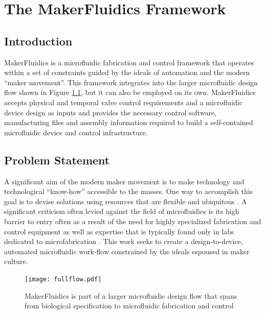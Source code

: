 \chapter{The MakerFluidics Framework}
\label{chapter:mf}
\thispagestyle{myheadings}

\graphicspath{{2_MakerFluidics/Figures/}}

\section{Introduction}
\label{sec:mfIntro}

MakerFluidics is a microfluidic fabrication and control framework that operates within a set of constraints guided by the ideals of automation and the modern ``maker movement''. This framework integrates into the larger microfluidic design flow shown in Figure \ref{fig:fullflow}, but it can also be employed on its own. MakerFluidics accepts physical and temporal valve control requirements and a microfluidic device design as inputs and provides the necessary control software, manufacturing files and assembly information required to build a self-contained microfluidic device and control infrastructure.

\section{Problem Statement}
\label{sec:mfPS}
A significant aim of the modern maker movement is to make technology and technological ``know-how'' accessible to the masses. One way to accomplish this goal is to devise solutions using resources that are flexible and ubiquitous \cite{schrock2014education}. A significant criticism often levied against the field of microfluidics is its high barrier to entry often as a result of the need for highly specialized fabrication and control equipment as well as expertise that is typically found only in labs dedicated to microfabrication \cite{whitesides2006}. This work seeks to create a design-to-device, automated microfluidic work-flow constrained by the ideals espoused in maker culture. 

\begin{figure}[h]
  \begin{minipage}[t]{0.99\linewidth}\centering
    \texttt{[image: fullflow.pdf]}
    \medskip
  \end{minipage}\hfill
  \caption[Microfluidic specify--design--build workflow]{MakerFluidics is part of a larger microfluidic design flow that spans from biological specification to microfluidic fabrication and control}
    \label{fig:fullflow}
\end{figure}



